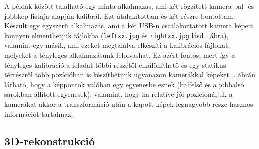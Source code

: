 \documentclass[a4paper,oneside]{article}
\begin{document}
A példák között található egy minta-alkalmazás, ami két rögzített kamera bal- és jobbkép listája alapján kalibrál. Ezt átalakítottam és két részre bontottam. Készült egy egyszerű alkalmazás, ami a két USB-n csatlakoztatott kamera képeit könnyen elmenthetjük fájlokba (\texttt{leftxx.jpg} és \texttt{rightxx.jpg} lásd . ábra), valamint egy másik, ami ezeket megtalálva elkészíti a kalibrációs fájlokat, melyeket a tényleges alkalmazásunk felolvashat. Ez azért fontos, mert így a tényleges kalibráció a feladat többi részétől elkülöníthető és egy statikus térrészről több pozícióban is készíthetünk ugyanazon kamerákkal képeket. . ábrán látható, hogy a képpontok valóban egy egyenesbe esnek (balfelső és a jobbalsó sarokban állított egyenesek), valamint, hogy ha relatíve jól pozicionáljuk a kamerákat akkor a transzformáció után a kapott képek legnagyobb része hasznos információt tartalmaz.

\subsection{3D-rekonstrukció}
\end{document}
